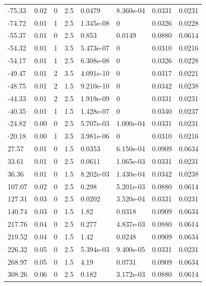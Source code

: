 \documentclass[preview]{standalone}
\begin{document}
{{\begin{tabular}{L{1.2cm}C{1.2cm} C{0.3cm}C{0.5cm} C{1.4cm}C{1.4cm} C{1.4cm}C{1.4cm}}
  -75.33  &  0.02  & 0     & 2.5 &  0.0479  & 8.360e-04  & 0.0331 &  0.0231   \\ 
  -74.72  &  0.01  & 1     & 2.5 &  1.345e-08  & 0  & 0.0326 &  0.0228   \\ 
  -55.37  &  0.01  & 0     & 2.5 &  0.853  & 0.0149  & 0.0880 &  0.0614   \\ 
  -54.32  &  0.01  & 1     & 3.5 &  5.473e-07  & 0  & 0.0310 &  0.0216   \\ 
  -54.17  &  0.01  & 1     & 2.5 &  6.308e-08  & 0  & 0.0326 &  0.0228   \\ 
  -49.47  &  0.01  & 2     & 3.5 &  4.091e-10  & 0  & 0.0317 &  0.0221   \\ 
  -48.75  &  0.01  & 2     & 1.5 &  9.210e-10  & 0  & 0.0342 &  0.0238   \\ 
  -44.33  &  0.01  & 2     & 2.5 &  1.919e-09  & 0  & 0.0331 &  0.0231   \\ 
  -40.35  &  0.01  & 1     & 1.5 &  1.428e-07  & 0  & 0.0340 &  0.0237   \\ 
  -24.82  &  0.00  & 0     & 2.5 &  5.707e-03  & 1.000e-04  & 0.0331 &  0.0231   \\ 
  -20.18  &  0.00  & 1     & 3.5 &  3.981e-06  & 0  & 0.0310 &  0.0216   \\ 
  27.57  &  0.01  & 0     & 1.5 &  0.0353  & 6.150e-04  & 0.0909 &  0.0634   \\ 
  33.61  &  0.01  & 0     & 2.5 &  0.0611  & 1.065e-03  & 0.0331 &  0.0231   \\ 
  36.36  &  0.01  & 0     & 1.5 &  8.202e-03  & 1.430e-04  & 0.0342 &  0.0238   \\ 
  107.07  &  0.02  & 0     & 2.5 &  0.298  & 5.201e-03  & 0.0880 &  0.0614   \\ 
  127.31  &  0.03  & 0     & 2.5 &  0.0202  & 3.520e-04  & 0.0331 &  0.0231   \\ 
  140.74  &  0.03  & 0     & 1.5 &  1.82  & 0.0318  & 0.0909 &  0.0634   \\ 
  217.76  &  0.04  & 0     & 2.5 &  0.277  & 4.837e-03  & 0.0880 &  0.0614   \\ 
  219.52  &  0.04  & 0     & 1.5 &  1.42  & 0.0248  & 0.0909 &  0.0634   \\ 
  226.32  &  0.05  & 0     & 2.5 &  5.394e-03  & 9.400e-05  & 0.0331 &  0.0231   \\ 
  268.97  &  0.05  & 0     & 1.5 &  4.19  & 0.0731  & 0.0909 &  0.0634   \\ 
  308.26  &  0.06  & 0     & 2.5 &  0.182  & 3.172e-03  & 0.0880 &  0.0614   \\ 

\end{tabular}}}
\end{document}
